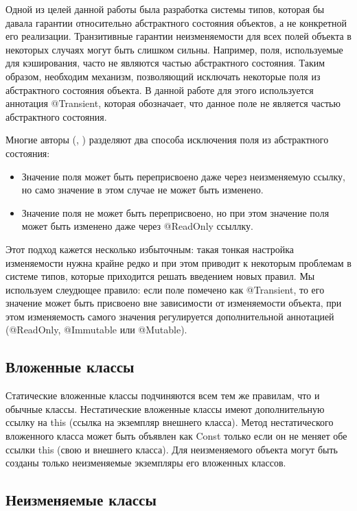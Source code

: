 Одной из целей данной работы была разработка системы типов, которая бы давала гарантии относительно абстрактного состояния объектов, а не конкретной его реализации. Транзитивные гарантии неизменяемости для всех полей объекта в некоторых случаях могут быть слишком сильны. Например, поля, используемые для кэширования, часто не являются частью абстрактного состояния. Таким образом, необходим механизм, позволяющий исключать некоторые поля из абстрактного состояния объекта. В данной работе для этого используется аннотация @Transient, которая обозначает, что данное поле не является частью абстрактного состояния. 

Многие авторы (\cite{Zibin2007}, \cite{Tschantz2006}) разделяют два способа исключения поля из абстрактного состояния:
\begin{itemize}
\item{Значение поля может быть переприсвоено даже через неизменяемую ссылку, но само значение в этом случае не может быть изменено.}
\item{Значение поля не может быть переприсвоено, но при этом значение поля может быть изменено даже через @ReadOnly ссыллку.}
\end{itemize}
Этот подход кажется несколько избыточным: такая тонкая настройка изменяемости нужна крайне редко и при этом приводит к некоторым проблемам в системе типов, которые приходится решать введением новых правил. Мы используем слеудющее правило: если поле помечено как @Transient, то его значение может быть присвоено вне зависимости от изменяемости объекта, при этом изменяемость самого значения регулируется дополнительной аннотацией (@ReadOnly, @Immutable или @Mutable).

\subsection{Вложенные классы}

Статические вложенные классы подчиняются всем тем же правилам, что и обычные классы. Нестатические вложенные классы имеют дополнительную ссылку на this (ссылка на экземпляр внешнего класса). Метод нестатического вложенного класса может быть объявлен как Const только если он не меняет обе ссылки this (свою и внешнего класса). Для неизменяемого объекта могут быть созданы только неизменяемые экземпляры его вложенных классов. 

\subsection{Неизменяемые классы}

